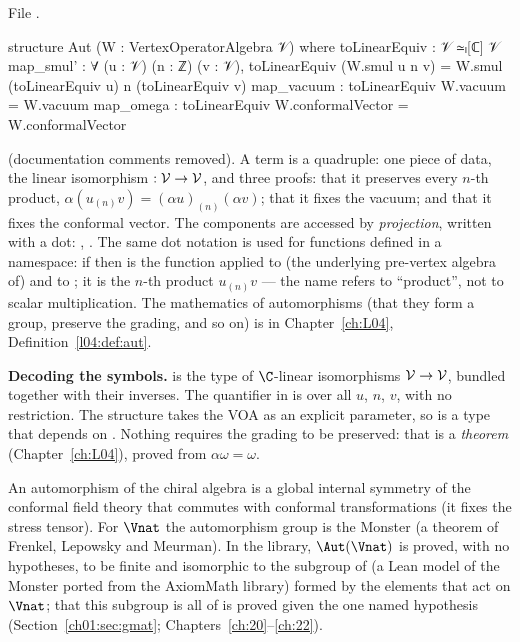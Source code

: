 \begin{example}\label{ch01:ex:aut}
\noindent File .
\begin{leancode}
structure Aut (W : VertexOperatorAlgebra 𝒱) where
  toLinearEquiv : 𝒱 ≃ₗ[ℂ] 𝒱
  map_smul' : ∀ (u : 𝒱) (n : ℤ) (v : 𝒱),
    toLinearEquiv (W.smul u n v) = W.smul (toLinearEquiv u) n (toLinearEquiv v)
  map_vacuum : toLinearEquiv W.vacuum = W.vacuum
  map_omega : toLinearEquiv W.conformalVector = W.conformalVector
\end{leancode}
(documentation comments removed). A term  is a quadruple: one piece of data, the
linear isomorphism  $:\mathcal{V}\to\mathcal{V}$, and three proofs: that it preserves
every $n$-th product, $\alpha(u_{(n)}v) = (\alpha u)_{(n)}(\alpha v)$; that it fixes the vacuum;
and that it fixes the conformal vector. The components are accessed by \emph{projection}, written
with a dot: , . The same dot notation is used for functions
defined in a namespace: if  then  is the
function  applied to (the underlying pre-vertex algebra of)  and to
; it is the $n$-th product $u_{(n)}v$ --- the name  refers to ``product'', not
to scalar multiplication. The mathematics of automorphisms (that they form a group, preserve the
grading, and so on) is in Chapter~\ref{ch:L04}, Definition~\ref{l04:def:aut}.
\end{example}

\begin{dictionary}
\textbf{Decoding the symbols.}  is the type of $\C$-linear isomorphisms
$\mathcal{V}\to\mathcal{V}$, bundled together with their inverses. The quantifier in  is over
all $u$, $n$, $v$, with no restriction. The structure takes the VOA  as an explicit
parameter, so  is a type that depends on . Nothing requires the grading to be
preserved: that is a \emph{theorem} (Chapter~\ref{ch:L04}), proved from $\alpha\omega = \omega$.
\end{dictionary}

\begin{physics}
An automorphism of the chiral algebra is a global internal symmetry of the conformal field theory
that commutes with conformal transformations (it fixes the stress tensor). For $\Vnat$ the
automorphism group is the Monster (a theorem of Frenkel, Lepowsky and Meurman). In the library,
$\Aut(\Vnat)$ is proved, with no hypotheses, to be finite and isomorphic to the subgroup of  (a Lean model
of the Monster ported from the AxiomMath library) formed by the elements that act on $\Vnat$; that this subgroup is all
of  is proved given the one named hypothesis  (Section~\ref{ch01:sec:gmat};
Chapters~\ref{ch:20}--\ref{ch:22}).
\end{physics}

